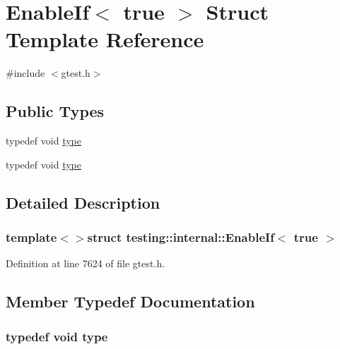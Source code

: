 \hypertarget{structtesting_1_1internal_1_1EnableIf_3_01true_01_4}{\section{\-Enable\-If$<$ true $>$ \-Struct \-Template \-Reference}
\label{d0/d2f/structtesting_1_1internal_1_1EnableIf_3_01true_01_4}
}


{\ttfamily \#include $<$gtest.\-h$>$}

\subsection*{\-Public \-Types}
\begin{DoxyCompactItemize}
\item 
typedef void \hyperlink{structtesting_1_1internal_1_1EnableIf_3_01true_01_4_ab1552f8e45b26f82fdca0e71da39d755}{type}
\item 
typedef void \hyperlink{structtesting_1_1internal_1_1EnableIf_3_01true_01_4_ab1552f8e45b26f82fdca0e71da39d755}{type}
\end{DoxyCompactItemize}


\subsection{\-Detailed \-Description}
\subsubsection*{template$<$$>$struct testing\-::internal\-::\-Enable\-If$<$ true $>$}



\-Definition at line 7624 of file gtest.\-h.



\subsection{\-Member \-Typedef \-Documentation}
\hypertarget{structtesting_1_1internal_1_1EnableIf_3_01true_01_4_ab1552f8e45b26f82fdca0e71da39d755}{
\subsubsection[{type}]{\setlength{\rightskip}{0pt plus 5cm}typedef void {\bf type}}}\label{d0/d2f/structtesting_1_1internal_1_1EnableIf_3_01true_01_4_ab1552f8e45b26f82fdca0e71da39d755}


